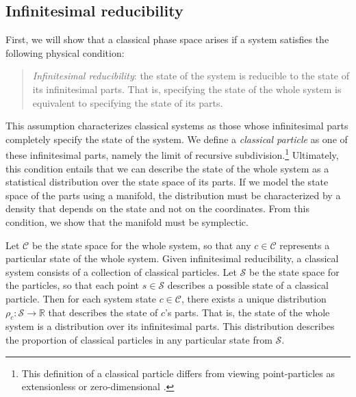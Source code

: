 \documentclass[12pt, twoside]{article}
\newcommand\bs{\begin{singlespace}}
\newcommand\es{\end{singlespace}}
\begin{document}

\subsection{Infinitesimal reducibility}
\label{infinitesimal}

First, we will show that a classical phase space arises if a system satisfies the following physical condition:
\newpage %

\begin{quotation}
\bs \noindent
\textit{Infinitesimal reducibility}: the state of the system is reducible to the state of its infinitesimal parts. That is, specifying the state of the whole system is equivalent to specifying the state of its parts.
\es
\end{quotation}


\noindent
This assumption characterizes classical systems as those whose infinitesimal parts completely specify the state of the system. We define a \textit{classical particle} as one of these infinitesimal parts, namely the limit of recursive subdivision.\footnote{This definition of a classical particle differs from viewing point-particles as extensionless \parencites[]{Butterfieldpoints} or zero-dimensional \parencites[]{Wilson}.} {\color{green} Ultimately, this condition entails that we can describe the state of the whole system as a statistical distribution over the state space of its parts. If we model the state space of the parts using a manifold, the distribution must be characterized by a density that depends on the state and not on the coordinates. From this condition, we show that the manifold must be symplectic.}

Let $\mathcal{C}$ be the state space for the whole system, so that any $c \in \mathcal{C}$ represents a particular state of the whole system. Given infinitesimal reducibility, a classical system consists of a collection of classical particles. Let $\mathcal{S}$ be the state space for the particles, so that each point $s \in \mathcal{S}$ describes a possible state of a classical particle. Then for each system state $c \in \mathcal{C}$, there exists a unique distribution $\rho_c : \mathcal{S} \to \mathbb{R} $ that describes the state of $c$'s parts. That is, the state of the whole system is a distribution over its infinitesimal parts. This distribution describes the proportion of classical particles in any particular state from $\mathcal{S}$.
\end{document}
